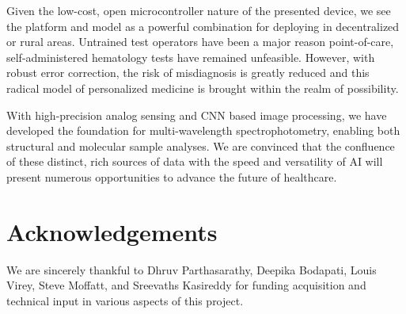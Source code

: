 \documentclass{article}
\begin{document}
Given the low-cost, open microcontroller nature of the presented device, we see the platform and model as a powerful combination for deploying in decentralized or rural areas. Untrained test operators have been a major reason point-of-care, self-administered hematology tests have remained unfeasible. However, with robust error correction, the risk of misdiagnosis is greatly reduced and this radical model of personalized medicine is brought within the realm of possibility.

With high-precision analog sensing and CNN based image processing, we have developed the foundation for multi-wavelength spectrophotometry, enabling both structural and molecular sample analyses. We are convinced that the confluence of these distinct, rich sources of data with the speed and versatility of AI will present numerous opportunities to advance the future of healthcare.

\section{Acknowledgements}
We are sincerely thankful to Dhruv Parthasarathy, Deepika Bodapati, Louis Virey, Steve Moffatt, and Sreevaths Kasireddy for funding acquisition and technical input in various aspects of this project.

\medskip
\end{document}
